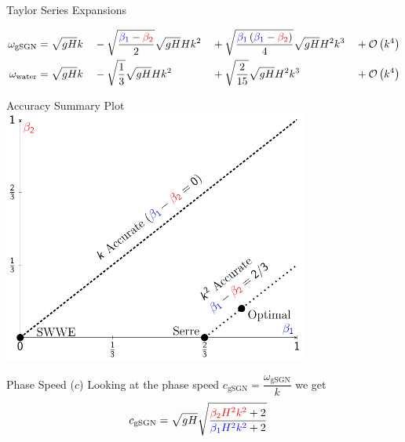 \documentclass[pdf]{beamer}
\begin{document}
\begin{frame}{Taylor Series Expansions}

{\footnotesize
\begin{align*}
\omega_{\text{gSGN}} & = \sqrt{gH} k &&- \sqrt{\frac{ {\color{blue}\beta_1} - {\color{red}\beta_2}  }{2}} \sqrt{gH} H  k^2 &&+  \sqrt{\frac{{\color{blue}\beta_1}\left({\color{blue}\beta_1}- {\color{red}\beta_2}\right) }{4}}  \sqrt{gH} H^2 k^3 &&+ \mathcal{O}\left(k^4\right)\\
\omega_{\text{water}} & = \sqrt{gH} k &&- \sqrt{\frac{1}{3}} \sqrt{gH} H k^2   &&+  \sqrt{\frac{2}{15}}\sqrt{gH} H^2 k^3  &&+ \mathcal{O}\left(k^4\right) 
\end{align*}}
\end{frame}


\begin{frame}{Accuracy Summary Plot}
\centering
	\includegraphics[width=0.75\textwidth]{./Pics/Tex/Explanatory/RegionsPlot/AccuracySummary.pdf}
\end{frame}


\begin{frame}{Phase Speed ($c$)}
Looking at the phase speed  $c_{\text{gSGN}} = \dfrac{\omega_{\text{gSGN}}}{k}$ we get
\begin{align*}
c_{\text{gSGN}} &= \sqrt{gH} \sqrt{ \dfrac{{\color{red}\beta_2 H^2 k^2} + 2}{ {\color{blue}\beta_1 H^2 k^2} + 2}}
\end{align*}
\end{frame}
\end{document}
